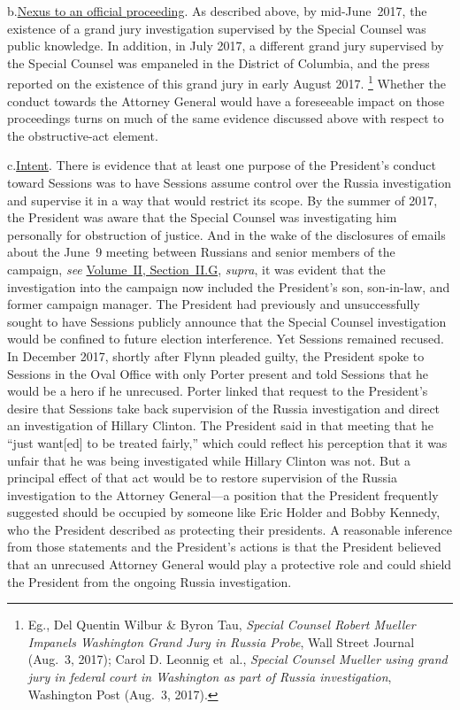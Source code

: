 b.\qquad\underline{Nexus to an official proceeding}.
As described above, by mid-June~2017, the existence of a grand jury investigation supervised by the Special Counsel was public knowledge.
In addition, in July 2017, a different grand jury supervised by the Special Counsel was empaneled in the District of Columbia, and the press reported on the existence of this grand jury in early August 2017.%
\footnote{Eg., Del Quentin Wilbur \& Byron Tau, \textit{Special Counsel Robert Mueller Impanels Washington Grand Jury in Russia Probe}, Wall Street Journal (Aug.~3, 2017);
Carol D. Leonnig et~al., \textit{Special Counsel Mueller using grand jury in federal court in Washington as part of Russia investigation}, Washington Post (Aug.~3, 2017).}
Whether the conduct towards the Attorney General would have a foreseeable impact on those proceedings turns on much of the same evidence discussed above with respect to the obstructive-act element.

c.\qquad\underline{Intent}.
There is evidence that at least one purpose of the President's conduct toward Sessions was to have Sessions assume control over the Russia investigation and supervise it in a way that would restrict its scope.
By the summer of 2017, the President was aware that the Special Counsel was investigating him personally for obstruction of justice.
And in the wake of the disclosures of emails about the June~9 meeting between Russians and senior members of the campaign, \textit{see} \hyperlink{subsection.2.2.7}{Volume~II, Section~II.G}, \textit{supra}, it was evident that the investigation into the campaign now included the President's son, son-in-law, and former campaign manager.
The President had previously and unsuccessfully sought to have Sessions publicly announce that the Special Counsel investigation would be confined to future election interference.
Yet Sessions remained recused.
In December 2017, shortly after Flynn pleaded guilty, the President spoke to Sessions in the Oval Office with only Porter present and told Sessions that he would be a hero if he unrecused.
Porter linked that request to the President's desire that Sessions take back supervision of the Russia investigation and direct an investigation of Hillary Clinton.
The President said in that meeting that he ``just want[ed] to be treated fairly,'' which could reflect his perception that it was unfair that he was being investigated while Hillary Clinton was not.
But a principal effect of that act would be to restore supervision of the Russia investigation to the
Attorney General---a position that the President frequently suggested should be occupied by someone like Eric Holder and Bobby Kennedy, who the President described as protecting their presidents.
A reasonable inference from those statements and the President's actions is that the President believed that an unrecused Attorney General would play a protective role and could shield the President from the ongoing Russia investigation.


